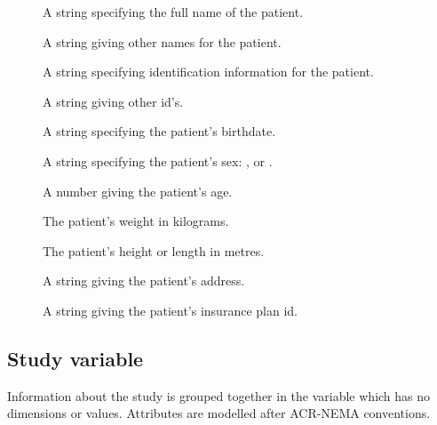 \documentclass{article}
\begin{document}
\begin{description}
   \item [] A string specifying the full name of the
      patient.
   \item [] A string giving other names for the
      patient. 
   \item [] A string specifying identification
      information for the patient.
   \item [] A string giving other id's.
   \item [] A string specifying the patient's
      birthdate.
   \item [] A string specifying the patient's sex:
      ,  or .
   \item [] A number giving the patient's age.
   \item [] The patient's weight in kilograms.
   \item [] The patient's height or length in metres.
   \item [] A string giving the patient's address.
   \item [] A string giving the patient's
      insurance plan id.
\end{description}

\subsection{Study variable}

Information about the study is grouped together in the 
variable which has no dimensions or values. Attributes are modelled
after ACR-NEMA conventions.
\end{document}
